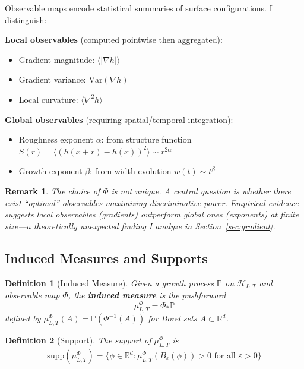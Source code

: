 \documentclass[aps,pre,reprint,amsmath,amssymb,superscriptaddress]{revtex4-2}
\newtheorem{definition}{Definition}
\newtheorem{remark}{Remark}
\newcommand{\calH}{\mathcal{H}}
\newcommand{\bbP}{\mathbb{P}}
\newcommand{\bbR}{\mathbb{R}}
\newcommand{\supp}{\text{supp}}
\begin{document}
Observable maps encode statistical summaries of surface configurations. I distinguish:

\textbf{Local observables} (computed pointwise then aggregated):
\begin{itemize}
\item Gradient magnitude: $\langle |\nabla h| \rangle$
\item Gradient variance: $\text{Var}(\nabla h)$
\item Local curvature: $\langle \nabla^2 h \rangle$
\end{itemize}

\textbf{Global observables} (requiring spatial/temporal integration):
\begin{itemize}
\item Roughness exponent $\alpha$: from structure function $S(r) = \langle (h(x+r)-h(x))^2 \rangle \sim r^{2\alpha}$
\item Growth exponent $\beta$: from width evolution $w(t) \sim t^\beta$
\end{itemize}

\begin{remark}
The choice of $\Phi$ is not unique. A central question is whether there exist ``optimal'' observables maximizing discriminative power. Empirical evidence suggests local observables (gradients) outperform global ones (exponents) at finite size---a theoretically unexpected finding I analyze in Section~\ref{sec:gradient}.
\end{remark}

\subsection{Induced Measures and Supports}

\begin{definition}[Induced Measure]
Given a growth process $\bbP$ on $\calH_{L,T}$ and observable map $\Phi$, the \textbf{induced measure} is the pushforward
\begin{equation}
\mu^\Phi_{L,T} = \Phi_* \bbP
\end{equation}
defined by $\mu^\Phi_{L,T}(A) = \bbP(\Phi^{-1}(A))$ for Borel sets $A \subset \bbR^d$.
\end{definition}

\begin{definition}[Support]
The support of $\mu^\Phi_{L,T}$ is
\begin{equation}
\supp(\mu^\Phi_{L,T}) = \{\phi \in \bbR^d : \mu^\Phi_{L,T}(B_\varepsilon(\phi)) > 0 \text{ for all } \varepsilon > 0\}
\end{equation}
\end{definition}
\end{document}
